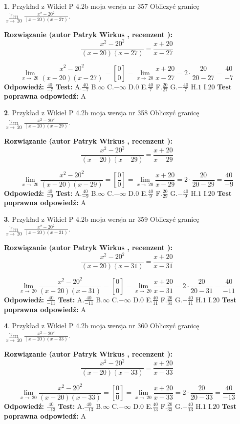 \documentclass[12pt, a4paper]{article}
\theoremstyle{definition} %
\newtheorem{zad}{}
\newcommand{\zadStart}[1]{\begin{zad}#1\newline}
\newcommand{\zadStop}{\end{zad}}
\newcommand{\rozwStart}[2]{\noindent \textbf{Rozwiązanie (autor #1 , recenzent #2): }\newline}
\newcommand{\rozwStop}{\newline}
\newcommand{\odpStart}{\noindent \textbf{Odpowiedź:}\newline}
\newcommand{\odpStop}{\newline}
\newcommand{\testStart}{\noindent \textbf{Test:}\newline}
\newcommand{\testStop}{\newline}
\newcommand{\kluczStart}{\noindent \textbf{Test poprawna odpowiedź:}\newline}
\newcommand{\kluczStop}{\newline}
\begin{document}
\zadStart{Przykład z Wikieł P 4.2b moja wersja nr 357}
Obliczyć granicę $\lim\limits_{x\to\ 20}\frac{x^{2}-20^{2}}{(x-20)(x-27)}$.
\zadStop
\rozwStart{Patryk Wirkus}{}
$$\frac{x^{2}-20^{2}}{(x-20)(x-27)}=\frac{x+20}{x-27}$$

$$\lim\limits_{x\to\ 20}\frac{x^{2}-20^{2}}{(x-20)(x-27)}=[\frac{0}{0}]=\lim\limits_{x\to\ 20}\frac{x+20}{x-27}=2 \cdot \frac{20}{20-27} = \frac{40}{-7}$$
\rozwStop
\odpStart
$\frac{40}{-7}$
\odpStop
\testStart
A.$\frac{40}{-7}$
B.$\infty$
C.$-\infty$
D.$0$
E.$\frac{40}{7}$
F.$\frac{20}{27}$
G.$-\frac{40}{7}$
H.$1$
I.$20$
\testStop
\kluczStart
A
\kluczStop



\zadStart{Przykład z Wikieł P 4.2b moja wersja nr 358}
Obliczyć granicę $\lim\limits_{x\to\ 20}\frac{x^{2}-20^{2}}{(x-20)(x-29)}$.
\zadStop
\rozwStart{Patryk Wirkus}{}
$$\frac{x^{2}-20^{2}}{(x-20)(x-29)}=\frac{x+20}{x-29}$$

$$\lim\limits_{x\to\ 20}\frac{x^{2}-20^{2}}{(x-20)(x-29)}=[\frac{0}{0}]=\lim\limits_{x\to\ 20}\frac{x+20}{x-29}=2 \cdot \frac{20}{20-29} = \frac{40}{-9}$$
\rozwStop
\odpStart
$\frac{40}{-9}$
\odpStop
\testStart
A.$\frac{40}{-9}$
B.$\infty$
C.$-\infty$
D.$0$
E.$\frac{40}{9}$
F.$\frac{20}{29}$
G.$-\frac{40}{9}$
H.$1$
I.$20$
\testStop
\kluczStart
A
\kluczStop



\zadStart{Przykład z Wikieł P 4.2b moja wersja nr 359}
Obliczyć granicę $\lim\limits_{x\to\ 20}\frac{x^{2}-20^{2}}{(x-20)(x-31)}$.
\zadStop
\rozwStart{Patryk Wirkus}{}
$$\frac{x^{2}-20^{2}}{(x-20)(x-31)}=\frac{x+20}{x-31}$$

$$\lim\limits_{x\to\ 20}\frac{x^{2}-20^{2}}{(x-20)(x-31)}=[\frac{0}{0}]=\lim\limits_{x\to\ 20}\frac{x+20}{x-31}=2 \cdot \frac{20}{20-31} = \frac{40}{-11}$$
\rozwStop
\odpStart
$\frac{40}{-11}$
\odpStop
\testStart
A.$\frac{40}{-11}$
B.$\infty$
C.$-\infty$
D.$0$
E.$\frac{40}{11}$
F.$\frac{20}{31}$
G.$-\frac{40}{11}$
H.$1$
I.$20$
\testStop
\kluczStart
A
\kluczStop



\zadStart{Przykład z Wikieł P 4.2b moja wersja nr 360}
Obliczyć granicę $\lim\limits_{x\to\ 20}\frac{x^{2}-20^{2}}{(x-20)(x-33)}$.
\zadStop
\rozwStart{Patryk Wirkus}{}
$$\frac{x^{2}-20^{2}}{(x-20)(x-33)}=\frac{x+20}{x-33}$$

$$\lim\limits_{x\to\ 20}\frac{x^{2}-20^{2}}{(x-20)(x-33)}=[\frac{0}{0}]=\lim\limits_{x\to\ 20}\frac{x+20}{x-33}=2 \cdot \frac{20}{20-33} = \frac{40}{-13}$$
\rozwStop
\odpStart
$\frac{40}{-13}$
\odpStop
\testStart
A.$\frac{40}{-13}$
B.$\infty$
C.$-\infty$
D.$0$
E.$\frac{40}{13}$
F.$\frac{20}{33}$
G.$-\frac{40}{13}$
H.$1$
I.$20$
\testStop
\kluczStart
A
\kluczStop
\end{document}

